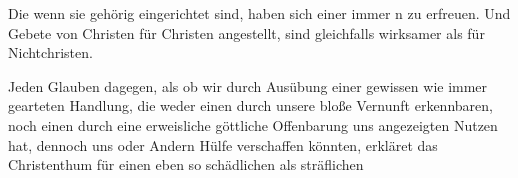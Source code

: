 \begin{aufza}
\item Die  wenn sie gehörig eingerichtet sind, haben sich einer immer n zu erfreuen. Und Gebete von Christen für Christen angestellt, sind gleichfalls wirksamer als für Nichtchristen.
\item Jeden Glauben dagegen, als ob wir durch Ausübung einer gewissen wie immer gearteten Handlung, die weder einen durch unsere bloße Vernunft erkennbaren, noch einen durch eine erweisliche göttliche Offenbarung uns angezeigten Nutzen hat, dennoch uns oder Andern Hülfe verschaffen könnten, erkläret das Christenthum für einen eben so schädlichen als sträflichen 
\end{aufza}

